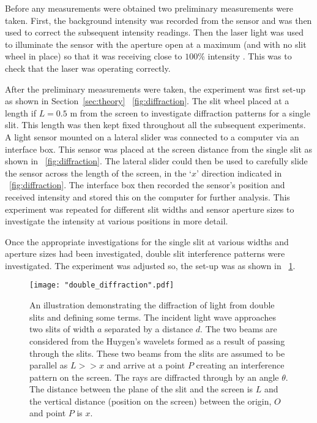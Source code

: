 \documentclass{article}
\newcommand{\figref}[2][\figurename~]{#1\ref{#2}}
\newcommand{\secref}[2][Section~]{#1\ref{#2}}
\begin{document}
\vspace{2mm}
\noindent
Before any measurements were obtained two preliminary measurements were taken. First, the background intensity was recorded from the sensor and was then used to correct the subsequent intensity readings. Then the laser light was used to illuminate the sensor with the aperture open at a maximum (and with no slit wheel in place) so that it was receiving close to $100\%$ intensity \cite{Paper01}. This was to check that the laser was operating correctly.

\vspace{2mm}
\noindent
After the preliminary measurements were taken, the experiment was first set-up as shown in \secref{sec:theory} \figref{fig:diffraction}. The slit wheel placed at a length if $L = 0.5$ m from the screen to investigate diffraction patterns for a single slit. This length was then kept fixed throughout all the subsequent experiments. A light sensor mounted on a lateral slider was connected to a computer via an interface box. This sensor was placed at the screen distance from the single slit as shown in \figref{fig:diffraction}. The lateral slider could then be used to carefully slide the sensor across the length of the screen, in the `$x$' direction indicated in \figref{fig:diffraction}. The interface box then recorded the sensor's position and received intensity and stored this on the computer for further analysis. This experiment was repeated for different slit widths and sensor aperture sizes to investigate the intensity at various positions in more detail.

\vspace{2mm}
\noindent
Once the appropriate investigations for the single slit at various widths and aperture sizes had been investigated, double slit interference patterns were investigated. The experiment was adjusted so, the set-up was as shown in \figref{fig:double_diffraction}.

\begin{figure}[h]
\centering
\texttt{[image: "double\_diffraction".pdf]}
\caption{An illustration demonstrating the diffraction of light from double slits and defining some terms. The incident light wave approaches two slits of width $a$ separated by a distance $d$. The two beams are considered from the Huygen's wavelets \cite{Book01} formed as a result of passing through the slits. These two beams from the slits are assumed to be parallel as $L >> x$ and arrive at a point $P$ creating an interference pattern on the screen. The rays are diffracted through by an angle $\theta$. The distance between the plane of the slit and the screen is $L$ and the vertical distance (position on the screen) between the origin, $O$ and point $P$ is $x$.}
\label{fig:double_diffraction}
\end{figure}
\end{document}
